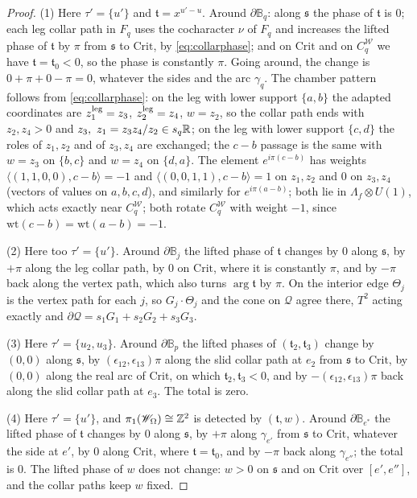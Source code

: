 \begin{proof}
(1) Here $\tau'=\{u'\}$ and $\mathfrak t=x^{u'-u}$. Around $\partial\mathbb B_q$: along $\mathfrak s$ the phase of $\mathfrak t$
is $0$; each leg collar path in $F_q$ uses the cocharacter $\nu$ of $F_q$ and increases the lifted phase of $\mathfrak t$ by
$\pi$ from $\mathfrak s$ to $\mathrm{Crit}$, by \eqref{eq:collarphase}; and on $\mathrm{Crit}$ and on $C^{\mathscr W}_q$ we have
$\mathfrak t=\mathfrak t_0<0$, so the phase is constantly $\pi$. Going around, the change is $0+\pi+0-\pi=0$, whatever the sides
and the arc $\gamma_q$. The chamber pattern follows from \eqref{eq:collarphase}: on the leg with lower support $\{a,b\}$ the
adapted coordinates are $z_1^{\rm leg}=z_3$, $z_2^{\rm leg}=z_4$, $w=z_2$, so the collar path ends with $z_2,z_4>0$ and
$z_3,\ z_1=z_3z_4/z_2\in s_q\mathbb R$; on the leg with lower support $\{c,d\}$ the roles of $z_1,z_2$ and of $z_3,z_4$ are
exchanged; the $c-b$ passage is the same with $w=z_3$ on $\{b,c\}$ and $w=z_4$ on $\{d,a\}$. The element $e^{i\pi(c-b)}$ has
weights $\langle(1,1,0,0),c-b\rangle=-1$ and $\langle(0,0,1,1),c-b\rangle=1$ on $z_1,z_2$ and $0$ on $z_3,z_4$ (vectors of values
on $a,b,c,d$), and similarly for $e^{i\pi(a-b)}$; both lie in $\Lambda_f\otimes U(1)$, which acts exactly near $C^{\mathscr W}_q$; both rotate
$C^{\mathscr W}_q$ with weight $-1$, since $\mathrm{wt}(c-b)=\mathrm{wt}(a-b)=-1$.

(2) Here too $\tau'=\{u'\}$. Around $\partial\mathbb B_j$ the lifted phase of $\mathfrak t$ changes by $0$ along $\mathfrak s$, by
$+\pi$ along the leg collar path, by $0$ on $\mathrm{Crit}$, where it is constantly $\pi$, and by $-\pi$ back along the vertex
path, which also turns $\arg\mathfrak t$ by $\pi$. On the interior edge $\Theta_j$ is the vertex path for each $j$, so
$G_j\cdot\Theta_j$ and the cone on $\mathcal Q$ agree there, $T^2$ acting exactly and $\partial\mathcal Q=s_1G_1+s_2G_2+s_3G_3$.

(3) Here $\tau'=\{u_2,u_3\}$. Around $\partial\mathbb B_p$ the lifted phases of $(\mathfrak t_2,\mathfrak t_3)$ change by $(0,0)$
along $\mathfrak s$, by $(\epsilon_{12},\epsilon_{13})\pi$ along the slid collar path at $e_2$ from $\mathfrak s$ to $\mathrm{Crit}$, by
$(0,0)$ along the real arc of $\mathrm{Crit}$, on which $\mathfrak t_2,\mathfrak t_3<0$, and by $-(\epsilon_{12},\epsilon_{13})\pi$ back
along the slid collar path at $e_3$. The total is zero.

(4) Here $\tau'=\{u'\}$, and $\pi_1(\mathscr W_\Omega)\cong\mathbb Z^2$ is detected by $(\mathfrak t,w)$. Around $\partial\mathbb B_{e^*}$ the
lifted phase of $\mathfrak t$ changes by $0$ along $\mathfrak s$, by $+\pi$ along $\gamma_{e'}$ from $\mathfrak s$ to
$\mathrm{Crit}$, whatever the side at $e'$, by $0$ along $\mathrm{Crit}$, where $\mathfrak t=\mathfrak t_0$, and by $-\pi$ back
along $\gamma_{e''}$; the total is $0$. The lifted phase of $w$ does not change: $w>0$ on $\mathfrak s$ and on $\mathrm{Crit}$
over $[e',e'']$, and the collar paths keep $w$ fixed.


\end{proof}
